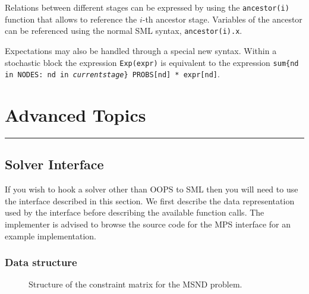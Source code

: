 \documentclass[10pt,a4paper]{book}
\begin{document}
Relations between different stages can be expressed by using the 
{\tt ancestor(i)} function that allows to reference the $i$-th ancestor
stage. Variables of the ancestor can be referenced using the normal SML syntax,
{\tt ancestor(i).x}.

Expectations may also be handled through a special new syntax. Within a
stochastic block the expression {\tt Exp(expr)} is equivalent to the expression
{\tt sum\{nd in NODES: nd in \textit{currentstage}\} PROBS[nd] * expr[nd]}.

\chapter{Advanced Topics}
\vspace{-0.6cm}\rule{\textwidth}{0.4ex}\vspace{0.1cm}

\section{Solver Interface}
\label{interface}

If you wish to hook a solver other than OOPS to SML then you will need to use
the interface described in this section. We first describe the data
representation used by the interface before describing the available function
calls. The implementer is advised to browse the source code for the MPS
interface for an example implementation.

\subsection{Data structure}
\begin{figure}
   \caption{ \label{Iface eg}
      Structure of the constraint matrix for the MSND problem.
   }
   \begin{center}
   \end{center}
\end{figure}
\end{document}
